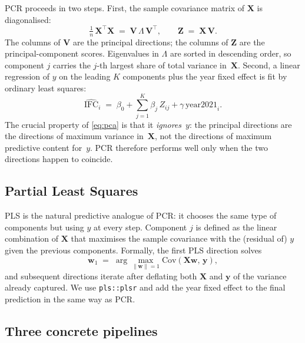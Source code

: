 \documentclass[11pt,a4paper]{article}
\begin{document}
PCR proceeds in two steps. First, the sample covariance matrix of
\(\mathbf{X}\) is diagonalised:
\begin{equation}
  \tfrac{1}{n}\,\mathbf{X}^{\top}\mathbf{X}
  \;=\;
  \mathbf{V}\,\Lambda\,\mathbf{V}^{\top},
  \qquad
  \mathbf{Z} \;=\; \mathbf{X}\,\mathbf{V}.
  \label{eq:pca}
\end{equation}
The columns of \(\mathbf{V}\) are the principal directions; the
columns of \(\mathbf{Z}\) are the principal-component scores.
Eigenvalues in \(\Lambda\) are sorted in descending order, so
component \(j\) carries the \(j\)-th largest share of total
variance in~\(\mathbf{X}\). Second, a linear regression of \(y\) on
the leading \(K\) components plus the year fixed effect is fit by
ordinary least squares:
\begin{equation}
  \widehat{\mathrm{IFC}}_i
  \;=\;
  \beta_{0}
  + \sum_{j=1}^{K} \beta_{j}\,Z_{ij}
  + \gamma\,\mathrm{year2021}_{i}.
  \label{eq:pcr}
\end{equation}
The crucial property of \eqref{eq:pca} is that it
\emph{ignores}~\(y\): the principal directions are the directions
of maximum variance in~\(\mathbf{X}\), not the directions of
maximum predictive content for~\(y\). PCR therefore performs well
only when the two directions happen to coincide.

\subsection{Partial Least Squares}

PLS is the natural predictive analogue of PCR: it chooses the same
type of components but using \(y\) at every step. Component \(j\)
is defined as the linear combination of \(\mathbf{X}\) that
maximises the sample covariance with the (residual of) \(y\) given
the previous components. Formally, the first PLS direction solves
\begin{equation}
  \mathbf{w}_{1}
  \;=\;
  \arg\max_{\|\mathbf{w}\| = 1}
    \mathrm{Cov}\!\left(\mathbf{X}\mathbf{w},\,\mathbf{y}\right),
  \label{eq:pls1}
\end{equation}
and subsequent directions iterate after deflating both
\(\mathbf{X}\) and \(\mathbf{y}\) of the variance already captured.
We use \texttt{pls::plsr} and add the year fixed effect to the
final prediction in the same way as PCR.

\subsection{Three concrete pipelines}
\end{document}
